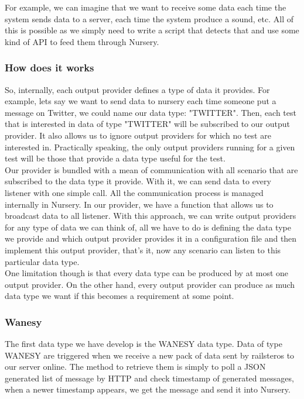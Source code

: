 \documentclass[12pt]{article}
\theoremstyle{definition}
\theoremstyle{definition}
\begin{document}
For example, we can imagine that we want to receive some data each time the system sends data to a server, each time the system produce a sound, etc. All of this is possible as we simply need to write a script that detects that and use some kind of API to feed them through Nursery.\\

\subsubsection{How does it works}

So, internally, each output provider defines a type of data it provides. For example, lets say we want to send data to nursery each time someone put a message on Twitter, we could name our data type: "TWITTER". Then, each test that is interested in data of type "TWITTER" will be subscribed to our output provider. It also allows us to ignore output providers for which no test are interested in. Practically speaking, the only output providers running for a given test will be those that provide a data type useful for the test.\\

Our provider is bundled with a mean of communication with all scenario that are subscribed to the data type it provide. With it, we can send data to every listener with one simple call. All the communication process is managed internally in Nursery.
In our provider, we have a function that allows us to broadcast data to all listener. With this approach, we can write output providers for any type of data we can think of, all we have to do is defining the data type we provide and which output provider provides it in a configuration file and then implement this output provider, that's it, now any scenario can listen to this particular data type.\\

One limitation though is that every data type can be produced by at most one output provider. On the other hand, every output provider can produce as much data type we want if this becomes a requirement at some point.\\

\subsubsection{Wanesy}

The first data type we have develop is the WANESY data type. Data of type WANESY are triggered when we receive a new pack of data sent by \gls{railsteros} to our server online. The method to retrieve them is simply to poll a JSON generated list of message by HTTP and check timestamp of generated messages, when a newer timestamp appears, we get the message and send it into Nursery.\\
\end{document}
